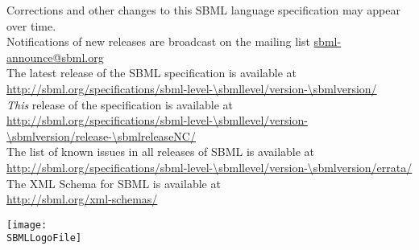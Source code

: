 \begin{center}
Corrections and other changes to this SBML language specification may appear over time.\\
Notifications of new releases are broadcast on the mailing list \href{http://www.sbml.org/forums}{sbml-announce@sbml.org}\\[10pt]

The latest release of the SBML \thisLV specification is available at\\
\url{http://sbml.org/specifications/sbml-level-\sbmllevel/version-\sbmlversion/}\\[10pt]

\emph{This} release of the specification is available at\\
\url{http://sbml.org/specifications/sbml-level-\sbmllevel/version-\sbmlversion/release-\sbmlreleaseNC/}\\[10pt]

The list of known issues in all releases of SBML \thisLV is available at\\
\url{http://sbml.org/specifications/sbml-level-\sbmllevel/version-\sbmlversion/errata/}\\[10pt]

The XML Schema for SBML \thisLV is available at\\
\url{http://sbml.org/xml-schemas/}\\[10pt]
\end{center}

\vfill

\centerline{\texttt{[image: \\SBMLLogoFile]}}

